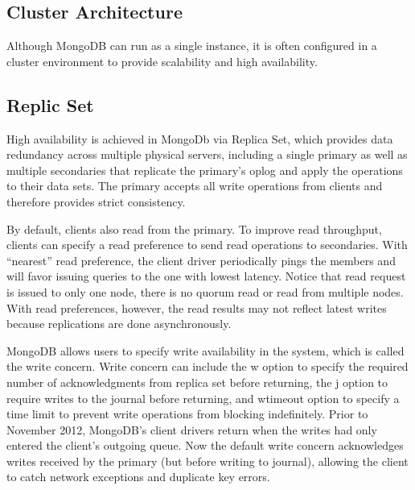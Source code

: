 \documentclass[11pt]{book}
\begin{document}
\subsection{Cluster Architecture}

Although MongoDB can run as a single instance, it is often configured in a cluster environment to provide scalability and high availability.

\subsection{Replic Set}
High availability is achieved in MongoDb via Replica Set, which provides data redundancy across multiple physical servers, including a single primary as well as multiple secondaries that replicate the primary's oplog and apply the operations to their data sets. The primary accepts all write operations from clients and therefore provides strict consistency. 

By default, clients also read from the primary. To improve read throughput, clients can specify a read preference to send read operations to secondaries. With ``nearest'' read preference, the client driver periodically pings the members and will favor issuing queries to the one with lowest latency. Notice that read request is issued to only one node, there is no quorum read or read from multiple nodes. With read preferences, however, the read results may not reflect latest writes because replications are done asynchronously. 

MongoDB allows users to specify write availability in the system, which is called the write concern. Write concern can include the w option to specify the required number of acknowledgments from replica set before returning, the j option to require writes to the journal before returning, and wtimeout option to specify a time limit to prevent write operations from blocking indefinitely. Prior to November 2012, MongoDB's client drivers return when the writes had only entered the client's outgoing queue. Now the default write concern acknowledges writes received by the primary (but before writing to journal), allowing the client to catch network exceptions and duplicate key errors. 
\end{document}
